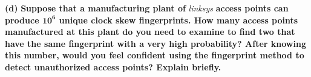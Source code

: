 \documentclass[11pt]{article}
\renewcommand\part[1]{\vspace{.10in}\textbf{(#1)}}
\begin{document}
\part{d} \textbf{Suppose that a manufacturing plant of} \textit{linksys} \textbf{access points can produce $\mathbf{10^6}$ unique clock skew fingerprints. How many access points manufactured at this plant do you need to examine to find two that have the same fingerprint with a very high probability? After knowing this number, would you feel confident using the fingerprint method to detect unauthorized access points? Explain briefly.}
\end{document}
